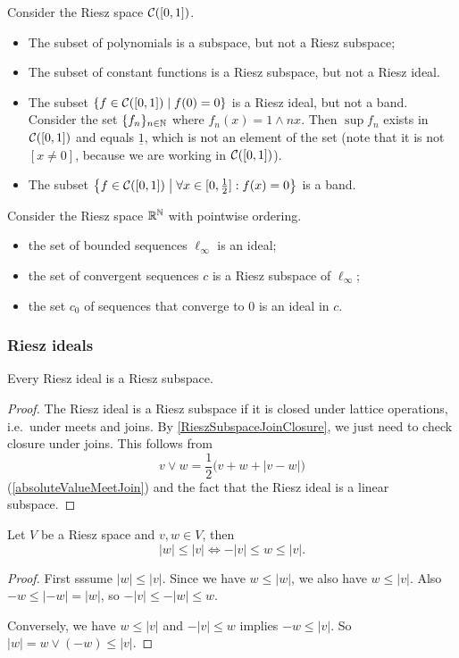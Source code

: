 \begin{example}
Consider the Riesz space $\cont(\interval{0,1})$.
\begin{itemize}
\item The subset of polynomials is a subspace, but not a Riesz subspace;
\item The subset of constant functions is a Riesz subspace, but not a Riesz ideal.
\item The subset $\setbuilder{f\in \cont(\interval{0,1})}{f(0) = 0}$ is a Riesz ideal, but not a band. Consider the set $\{f_n\}_{n\in\mathbb{N}}$ where $f_n(x) = 1 \wedge nx$. Then $\sup f_n$ exists in $\cont(\interval{0,1})$ and equals $\underline{1}$, which is not an element of the set (note that it is not $[x\neq 0]$, because we are working in $\cont(\interval{0,1})$).
\item The subset $\setbuilder{f\in \cont(\interval{0,1})}{\forall x\in \interval{0,\frac{1}{2}}: f(x) = 0}$ is a band. 
\end{itemize}
Consider the Riesz space $\mathbb{R}^{\mathbb{N}}$ with pointwise ordering.
\begin{itemize}
\item the set of bounded sequences $\ell_\infty$ is an ideal;
\item the set of convergent sequences $c$ is a Riesz subspace of $\ell_\infty$;
\item the set $c_0$ of sequences that converge to $0$ is an ideal in $c$.
\end{itemize}
\end{example}

\subsubsection{Riesz ideals}
\begin{lemma} \label{RieszIdealRieszSubspace}
Every Riesz ideal is a Riesz subspace.
\end{lemma}
\begin{proof}
The Riesz ideal is a Riesz subspace if it is closed under lattice operations, i.e.\ under meets and joins. By \ref{RieszSubspaceJoinClosure}, we just need to check closure under joins. This follows from
\[ v \vee w = \frac{1}{2}\big(v+ w+|v-w|\big) \]
(\ref{absoluteValueMeetJoin}) and the fact that the Riesz ideal is a linear subspace.
\end{proof}

\begin{lemma} \label{solidLemma}
Let $V$ be a Riesz space and $v,w\in V$, then
\[ |w|\leq |v| \iff -|v| \leq w \leq |v|. \]
\end{lemma}
\begin{proof}
First sssume $|w| \leq |v|$. Since we have $w \leq |w|$, we also have $w\leq |v|$. Also $-w \leq |-w| = |w|$, so $-|v| \leq -|w| \leq w$.

Conversely, we have $w\leq |v|$ and $-|v| \leq w$ implies $-w\leq |v|$. So $|w| = w\vee (-w) \leq |v|$.
\end{proof}

